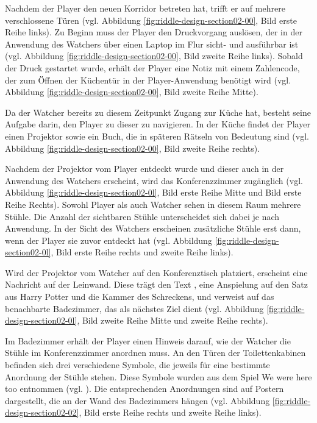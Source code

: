 Nachdem der Player den neuen Korridor betreten hat, trifft er auf mehrere verschlossene Türen (vgl. Abbildung \ref{fig:riddle-design-section02-00}, Bild erste Reihe links). Zu Beginn muss der Player den Druckvorgang auslösen, der in der Anwendung des Watchers über einen Laptop im Flur sicht- und ausführbar ist (vgl. Abbildung \ref{fig:riddle-design-section02-00}, Bild zweite Reihe links). Sobald der Druck gestartet wurde, erhält der Player eine Notiz mit einem Zahlencode, der zum Öffnen der Küchentür in der Player-Anwendung benötigt wird (vgl. Abbildung \ref{fig:riddle-design-section02-00}, Bild zweite Reihe Mitte).

Da der Watcher bereits zu diesem Zeitpunkt Zugang zur Küche hat, besteht seine Aufgabe darin, den Player zu dieser zu navigieren. In der Küche findet der Player einen Projektor sowie ein Buch, die in späteren Rätseln von Bedeutung sind (vgl. Abbildung \ref{fig:riddle-design-section02-00}, Bild zweite Reihe rechts). 

Nachdem der Projektor vom Player entdeckt wurde und dieser auch in der Anwendung des Watchers erscheint, wird das Konferenzzimmer zugänglich (vgl. Abbildung \ref{fig:riddle-design-section02-0l}, Bild erste Reihe Mitte und Bild erste Reihe Rechts). Sowohl Player als auch Watcher sehen in diesem Raum mehrere Stühle. Die Anzahl der sichtbaren Stühle unterscheidet sich dabei je nach Anwendung. In der Sicht des Watchers erscheinen zusätzliche Stühle erst dann, wenn der Player sie zuvor entdeckt hat  (vgl. Abbildung \ref{fig:riddle-design-section02-0l}, Bild erste Reihe rechts und zweite Reihe links).

Wird der Projektor vom Watcher auf den Konferenztisch platziert, erscheint eine Nachricht auf der Leinwand. Diese trägt den Text , eine Anspielung auf den Satz aus Harry Potter und die Kammer des Schreckens, und verweist auf das benachbarte Badezimmer, das als nächstes Ziel dient (vgl. Abbildung \ref{fig:riddle-design-section02-0l}, Bild zweite Reihe Mitte und zweite Reihe rechts).

Im Badezimmer erhält der Player einen Hinweis darauf, wie der Watcher die Stühle im Konferenzzimmer anordnen muss. An den Türen der Toilettenkabinen befinden sich drei verschiedene Symbole, die jeweils für eine bestimmte Anordnung der Stühle stehen. Diese Symbole wurden aus dem Spiel We were here too entnommen (vgl. \citealp{total_mayhem_games_we_2018}). Die entsprechenden Anordnungen sind auf Postern dargestellt, die an der Wand des Badezimmers hängen (vgl. Abbildung \ref{fig:riddle-design-section02-02}, Bild erste Reihe rechts und zweite Reihe links).


